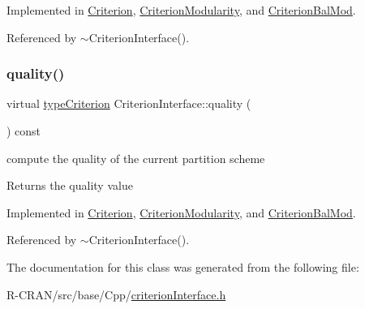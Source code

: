 Implemented in \hyperlink{classCriterion_a99e23ddc517ca3f2ea4766a5b4be0e3e}{Criterion}, \hyperlink{classCriterionModularity_a181617050bab1eeaaf38b2ad30dcfc43}{Criterion\+Modularity}, and \hyperlink{classCriterionBalMod_acf5001622eb8c495a5d5e8f044c22395}{Criterion\+Bal\+Mod}.



Referenced by $\sim$\+Criterion\+Interface().

\mbox{\label{classCriterionInterface_a5d287dc7755f7ce7d6a3d91f0d8fa5de}} 
\subsubsection{\texorpdfstring{quality()}{quality()}}
{\footnotesize\ttfamily virtual \hyperlink{criterionInterface_8h_af71ff22f6355fd69a4a62104bfd59a83}{type\+Criterion} Criterion\+Interface\+::quality (\begin{DoxyParamCaption}{ }\end{DoxyParamCaption}) const\hspace{0.3cm}{\ttfamily [pure virtual]}}

compute the quality of the current partition scheme

\begin{DoxyReturn}{Returns}
the quality value 
\end{DoxyReturn}


Implemented in \hyperlink{classCriterion_a1f8b3a7bf56b5434b04d5366d754d459}{Criterion}, \hyperlink{classCriterionModularity_adf9197fd4e5878ca86501447b1fba989}{Criterion\+Modularity}, and \hyperlink{classCriterionBalMod_a87c0ccb5e2a851420dc82bd23cc31716}{Criterion\+Bal\+Mod}.



Referenced by $\sim$\+Criterion\+Interface().



The documentation for this class was generated from the following file\+:\begin{DoxyCompactItemize}
\item 
R-\/\+C\+R\+A\+N/src/base/\+Cpp/\hyperlink{criterionInterface_8h}{criterion\+Interface.\+h}\end{DoxyCompactItemize}
